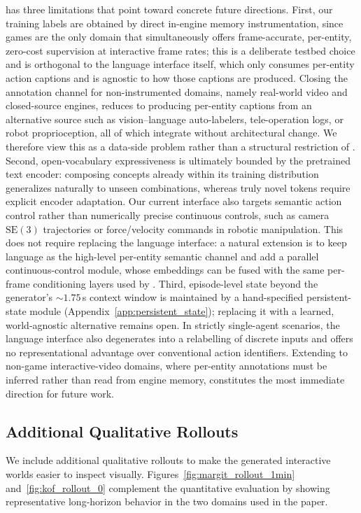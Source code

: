 \methodname has three limitations that point toward concrete future directions.
First, our training labels are obtained by direct in-engine memory instrumentation, since games are the only domain that simultaneously offers frame-accurate, per-entity, zero-cost supervision at interactive frame rates; this is a deliberate testbed choice and is orthogonal to the language interface itself, which only consumes per-entity action captions and is agnostic to how those captions are produced. Closing the annotation channel for non-instrumented domains, namely real-world video and closed-source engines, reduces to producing per-entity captions from an alternative source such as vision--language auto-labelers, tele-operation logs, or robot proprioception, all of which integrate without architectural change. We therefore view this as a data-side problem rather than a structural restriction of \methodname.
Second, open-vocabulary expressiveness is ultimately bounded by the pretrained text encoder: composing concepts already within its training distribution generalizes naturally to unseen combinations, whereas truly novel tokens require explicit encoder adaptation. Our current interface also targets semantic action control rather than numerically precise continuous controls, such as camera $\mathrm{SE}(3)$ trajectories or force/velocity commands in robotic manipulation. This does not require replacing the language interface: a natural extension is to keep language as the high-level per-entity semantic channel and add a parallel continuous-control module, whose embeddings can be fused with the same per-frame conditioning layers used by \methodname.
Third, episode-level state beyond the generator's ${\sim}1.75$\,s context window is maintained by a hand-specified persistent-state module (Appendix~\ref{app:persistent_state}); replacing it with a learned, world-agnostic alternative remains open.
In strictly single-agent scenarios, the language interface also degenerates into a relabelling of discrete inputs and offers no representational advantage over conventional action identifiers.
Extending \methodname to non-game interactive-video domains, where per-entity annotations must be inferred rather than read from engine memory, constitutes the most immediate direction for future work.


\subsection{Additional Qualitative Rollouts}
\label{app:qualitative_rollouts}
We include additional qualitative rollouts to make the generated interactive worlds easier to inspect visually.
Figures~\ref{fig:margit_rollout_1min} and~\ref{fig:kof_rollout_0} complement the quantitative evaluation by showing representative long-horizon behavior in the two domains used in the paper.


